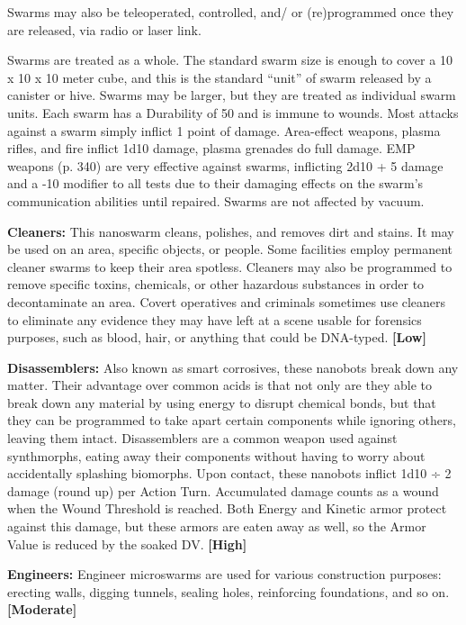 Swarms may also be teleoperated, controlled, and/
or (re)programmed once they are released, via radio 
or laser link.

Swarms are treated as a whole. The standard 
swarm size is enough to cover a 10 x 10 x 10 meter 
cube, and this is the standard ``unit'' of swarm released
by a canister or hive. Swarms may be larger,
but they are treated as individual swarm units. Each 
swarm has a Durability of 50 and is immune to 
wounds. Most attacks against a swarm simply inflict 
1 point of damage. Area-effect weapons, plasma rifles, 
and fire inflict 1d10 damage, plasma grenades do full 
damage. EMP weapons (p. 340) are very effective 
against swarms, inflicting 2d10 + 5 damage and a -10 
modifier to all tests due to their damaging effects on 
the swarm's communication abilities until repaired. 
Swarms are not affected by vacuum.

\textbf{Cleaners:} This nanoswarm cleans, polishes, and 
removes dirt and stains. It may be used on an area, 
specific objects, or people. Some facilities employ 
permanent cleaner swarms to keep their area spotless. 
Cleaners may also be programmed to remove specific 
toxins, chemicals, or other hazardous substances in 
order to decontaminate an area. Covert operatives 
and criminals sometimes use cleaners to eliminate 
any evidence they may have left at a scene usable for 
forensics purposes, such as blood, hair, or anything 
that could be DNA-typed. \textbf{[Low]}

\textbf{Disassemblers:} Also known as smart corrosives, 
these nanobots break down any matter. Their advantage
over common acids is that not only are
they able to break down any material by using 
energy to disrupt chemical bonds, but that they 
can be programmed to take apart certain components
while ignoring others, leaving them intact.
Disassemblers are a common weapon used against 
synthmorphs, eating away their components without
having to worry about accidentally splashing
biomorphs. Upon contact, these nanobots inflict 
1d10 ÷ 2 damage (round up) per Action Turn. Accumulated
damage counts as a wound when the
Wound Threshold is reached. Both Energy and Kinetic
armor protect against this damage, but these
armors are eaten away as well, so the Armor Value 
is reduced by the soaked DV. \textbf{[High]}

\textbf{Engineers:} Engineer microswarms are used for 
various construction purposes: erecting walls, digging 
tunnels, sealing holes, reinforcing foundations, and so 
on. \textbf{[Moderate]}

